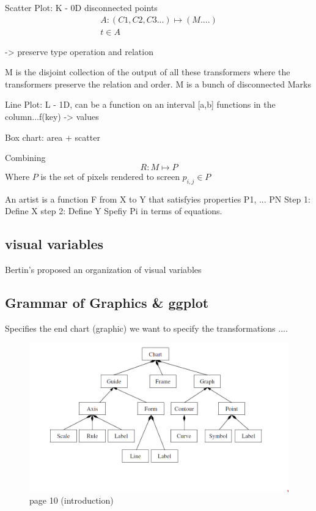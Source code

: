 \documentclass[letterpaper,onecolumn,titlepage]{Ythesis}
\begin{document}
Scatter Plot:
K - 0D disconnected points
\begin{multline}
A: (C1, C2, C3...)\mapsto (M....)\\
 t \in A 
\end{multline}

-> preserve type operation and relation

M is the disjoint collection of the output of all these transformers where the transformers preserve the relation and order. M is a bunch of disconnected Marks

Line Plot:
L - 1D, can be a function on an interval [a,b]
functions in the column...f(key) -> values

Box chart: area + scatter 


Combining 
\begin{equation}
    \label{eg:renderer}
    R: M \mapsto P
\end{equation}
Where $P$ is the set of pixels rendered to screen ${p_{i,j} \in P}$


An artist is a function F from X to Y
that satisfyies properties P1, ... PN
Step 1: Define X
step 2: Define Y
Spefiy Pi in terms of equations.


\subsection{visual variables}
Bertin's proposed an organization of visual variables \cite{bertinIIPropertiesGraphic2011} 


\subsection{Grammar of Graphics \& ggplot}
Specifies the end chart (graphic)
we want to specify the transformations ....
\begin{figure}
    \includegraphics{figures/intro/grammar_chart_composition.png}
    \caption{page 10 (introduction)}
\end{figure}
\end{document}
